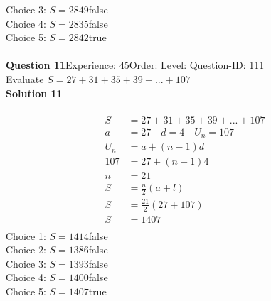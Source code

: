 \documentclass{article}
\begin{document}
Choice 3: \hspace{20pt}$S=2849$\hspace{20pt}false\\
Choice 4: \hspace{20pt}$S=2835$\hspace{20pt}false\\
Choice 5: \hspace{20pt}$S=2842$\hspace{20pt}true\\
\\[4pt]
\noindent\textbf{Question 11}\hspace{20pt}Experience: 45\hspace{20pt}Order: \hspace{20pt}Level: \hspace{20pt}Question-ID: 111\\[2pt]
Evaluate $S=27+31+35+39+...+107$\\[4pt]
\noindent\textbf{Solution 11}\\[2pt]
\\[-35pt]\begin{align*}
S&=27+31+35+39+...+107\\[2pt]
a&=27\quad d=4 \quad U_n=107\\[2pt]
U_n&=a+(n-1)d\\[2pt]
107&=27+(n-1)4\\[2pt]
n&=21\\[12pt]
S&=\displaystyle\frac{n}{2}(a+l)\\[2pt]
S&=\displaystyle\frac{21}{2}(27+107)\\[2pt]
S&=1407\\[-140pt]
\end{align*}
Choice 1: \hspace{20pt}$S=1414$\hspace{20pt}false\\
Choice 2: \hspace{20pt}$S=1386$\hspace{20pt}false\\
Choice 3: \hspace{20pt}$S=1393$\hspace{20pt}false\\
Choice 4: \hspace{20pt}$S=1400$\hspace{20pt}false\\
Choice 5: \hspace{20pt}$S=1407$\hspace{20pt}true\\
\end{document}
